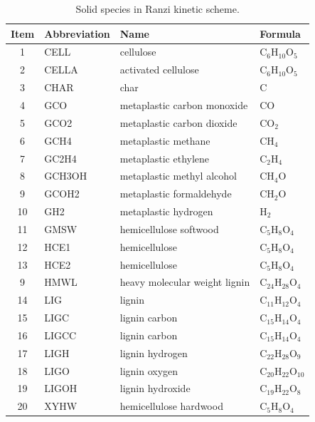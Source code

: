 \begin{table}[H]
	\centering
	\caption{Solid species in Ranzi kinetic scheme.}
	\begin{tabular}{@{}clll@{}}
		\toprule
		Item & Abbreviation & Name & Formula \\
		\midrule
		1  	& CELL 		& cellulose 					& C$_6$H$_{10}$O$_5$ \\
		2 	& CELLA 	& activated cellulose			& C$_6$H$_{10}$O$_5$ \\
		3 	& CHAR		& char 						  	& C \\
		4 	& GCO 		& metaplastic carbon monoxide 	& CO \\
		5 	& GCO2 		& metaplastic carbon dioxide  	& CO$_2$ \\
		6 	& GCH4		& metaplastic methane			& CH$_4$ \\
		7  	& GC2H4		& metaplastic ethylene			& C$_2$H$_4$ \\
		8 	& GCH3OH	& metaplastic methyl alcohol  	& CH$_4$O \\
		9 	& GCOH2		& metaplastic formaldehyde	  	& CH$_2$O \\
		10	& GH2 		& metaplastic hydrogen 		  	& H$_2$ \\
		11  & GMSW 		& hemicellulose softwood 		& C$_5$H$_8$O$_4$ \\
		12 	& HCE1 		& hemicellulose 		 		& C$_5$H$_8$O$_4$ \\
		13 	& HCE2 		& hemicellulose 		 		& C$_5$H$_8$O$_4$ \\
		9 	& HMWL		& heavy molecular weight lignin	& C$_{24}$H$_{28}$O$_4$ \\
		14  & LIG 		& lignin 				 		& C$_{11}$H$_{12}$O$_4$ \\
		15 	& LIGC 		& lignin carbon 		 		& C$_{15}$H$_{14}$O$_4$ \\
		16 	& LIGCC 	& lignin carbon 		 		& C$_{15}$H$_{14}$O$_4$ \\
		17 	& LIGH 		& lignin hydrogen 		 		& C$_{22}$H$_{28}$O$_9$ \\
		18 	& LIGO 		& lignin oxygen 		 		& C$_{20}$H$_{22}$O$_{10}$ \\
		19 	& LIGOH		& lignin hydroxide 		 		& C$_{19}$H$_{22}$O$_8$ \\
		20	& XYHW 		& hemicellulose hardwood 		& C$_5$H$_8$O$_4$ \\
		\bottomrule
	\end{tabular}
\end{table}


